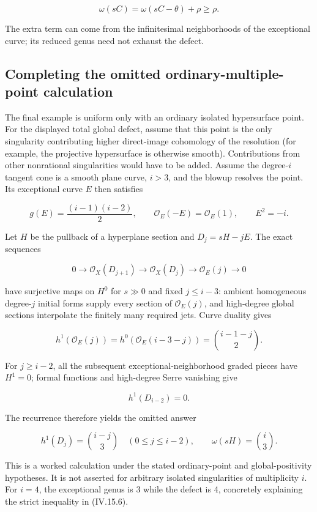 \[
\omega(sC)=\omega(sC-\theta)+\rho\ge\rho.
\tag{IV.15.6}
\]

The extra term can come from the infinitesimal neighborhoods of the exceptional curve; its reduced genus need not exhaust the defect.

\subsection{Completing the omitted ordinary-multiple-point calculation}

The final example is uniform only with an ordinary isolated hypersurface point. For the displayed total global defect, assume that this point is the only singularity contributing higher direct-image cohomology of the resolution (for example, the projective hypersurface is otherwise smooth). Contributions from other nonrational singularities would have to be added. Assume the degree-\(i\) tangent cone is a smooth plane curve, \(i>3\), and the blowup resolves the point. Its exceptional curve \(E\) then satisfies

\[
g(E)=\frac{(i-1)(i-2)}2,\qquad
\mathcal O_E(-E)=\mathcal O_E(1),\qquad E^2=-i.
\]

Let \(H\) be the pullback of a hyperplane section and \(D_j=sH-jE\). The exact sequences

\[
0\to\mathcal O_X(D_{j+1})\to\mathcal O_X(D_j)
\to\mathcal O_E(j)\to0
\]

have surjective maps on \(H^0\) for \(s\gg0\) and fixed \(j\le i-3\): ambient homogeneous degree-\(j\) initial forms supply every section of \(\mathcal O_E(j)\), and high-degree global sections interpolate the finitely many required jets. Curve duality gives

\[
h^1(\mathcal O_E(j))
=h^0(\mathcal O_E(i-3-j))
=\binom{i-1-j}{2}.
\]

For \(j\ge i-2\), all the subsequent exceptional-neighborhood graded pieces have \(H^1=0\); formal functions and high-degree Serre vanishing give

\[
h^1(D_{i-2})=0.
\]

The recurrence therefore yields the omitted answer

\[
\boxed{h^1(D_j)=\binom{i-j}{3}\quad(0\le j\le i-2),\qquad
\omega(sH)=\binom i3.}
\tag{IV.15.7}
\]

This is a worked calculation under the stated ordinary-point and global-positivity hypotheses. It is not asserted for arbitrary isolated singularities of multiplicity \(i\). For \(i=4\), the exceptional genus is 3 while the defect is 4, concretely explaining the strict inequality in (IV.15.6).

